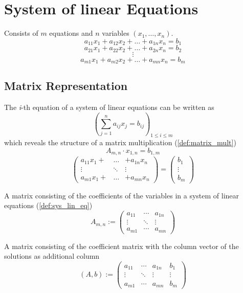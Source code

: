 \section{System of linear Equations}
\begin{definition}\label{def:sys_lin_eq}
   Consists of \(m\) equations and \(n\) variables \((x_1, \ldots, x_n)\).
   \[a_{11} x_1 + a_{12} x_2 + \ldots + a_{1n} x_n = b_1\]
   \[a_{21} x_1 + a_{22} x_2 + \ldots + a_{2n} x_n = b_2\]
   \[\vdots\]
   \[a_{m1} x_1 + a_{m2} x_2 + \ldots + a_{mn} x_n = b_m\]
\end{definition}

\subsection{Matrix Representation}
The \textit{i}-th equation of a system of linear equations can be written as
\[\left(\displaystyle\sum_{j=1}^n a_{ij} x_j = b_{ij}\right)_{1 \leq i \leq m}\]
which reveals the structure of a matrix multiplication (\ref{def:matrix_mult})
\[A_{m,n} \cdot x_{1,n} = b_{1,m}\]
\[\begin{pmatrix} a_{11} x_1 + & \ldots & + a_{1n} x_n \\ \vdots & \ddots & \vdots \\ a_{m1} x_1 + & \ldots & + a_{mn} x_n\end{pmatrix} = \begin{pmatrix} b_1 \\ \vdots \\ b_m \end{pmatrix}\]

\begin{definition}
   A matrix consisting of the coefficients of the variables in a system of linear equations (\ref{def:sys_lin_eq})
   \[A_{m,n} := \begin{pmatrix} a_{11} & \cdots & a_{1n} \\ \vdots & \ddots & \vdots \\ a_{m1} & \cdots & a_{mn}\end{pmatrix}\]
\end{definition}

\begin{definition}\label{def:extended_coefficient_matrix}
   A matrix consisting of the coefficient matrix with the column vector of the solutions as additional column
   \[(A, b) := \begin{pmatrix} a_{11} & \cdots & a_{1n} & b_1 \\ \vdots & \ddots & \vdots & \vdots \\ a_{m1} & \cdots & a_{mn} & b_m\end{pmatrix}\]
\end{definition}

